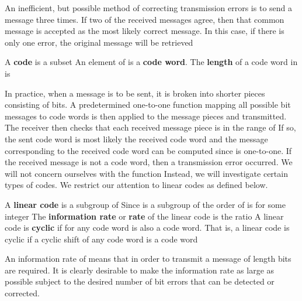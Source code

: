 \documentclass[11pt,oneside]{article}
\begin{document}
\begin{BookBody}

 An inefficient, but possible method of correcting transmission errors is to send a message three times. If two of the received messages agree, then that common message is accepted as the most likely correct message. In this case, if there is only one error, the original message will be retrieved\BookEnd{\blacktriangle}

 A\textbf{ code} is a subset  An element of  is a\textbf{ code word}. The\textbf{ length} of a code word in  is \BookEnd{\blacksquare}

\noindent In practice, when a message is to be sent, it is broken into shorter pieces consisting of  bits. A predetermined one-to-one function  mapping all possible  bit messages to code words is then applied to the message pieces and transmitted. The receiver then checks that each received message piece is in the range of  If so, the sent code word is most likely the received code word and the message corresponding to the received code word can be computed since  is one-to-one. If the received message is not a code word, then a transmission error occurred. We will not concern ourselves with the function  Instead, we will investigate certain types of codes. We restrict our attention to linear codes as defined below.

 A\textbf{ linear code} is a subgroup  of  Since  is a subgroup of  the order of  is  for some integer  The\textbf{ information rate} or\textbf{ rate} of the linear code is the ratio  A linear code is\textbf{ cyclic} if for any code word  is also a code word. That is, a linear code is cyclic if a cyclic shift of any code word is a code word\BookEnd{\blacksquare}

\noindent An information rate of  means that in order to transmit a message of length  bits are required. It is clearly desirable to make the information rate as large as possible subject to the desired number of bit errors that can be detected or corrected.


\end{BookBody}
\end{document}
